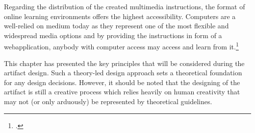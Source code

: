 Regarding the distribution of the created multimedia instructions, the format of online learning environments offers the highest accessibility. Computers are a well-relied on medium today as they represent one of the most flexible and widespread media options and by providing the instructions in form of a webapplication, anybody with computer access may access and learn from it.\footcites[Cf.][chapter 1, paragraphs 6 et seq]{ClarkElearningscienceinstruction2016}[cf.][p.906]{BaharinEvaluationSatisfactionUsing2015}

This chapter has presented the key principles that will be considered during the artifact design. Such a theory-led design approach sets a theoretical foundation for any design decisions. However, it should be noted that the designing of the artifact is still a creative process which relies heavily on human creativity that may not (or only arduously) be represented by theoretical guidelines.

